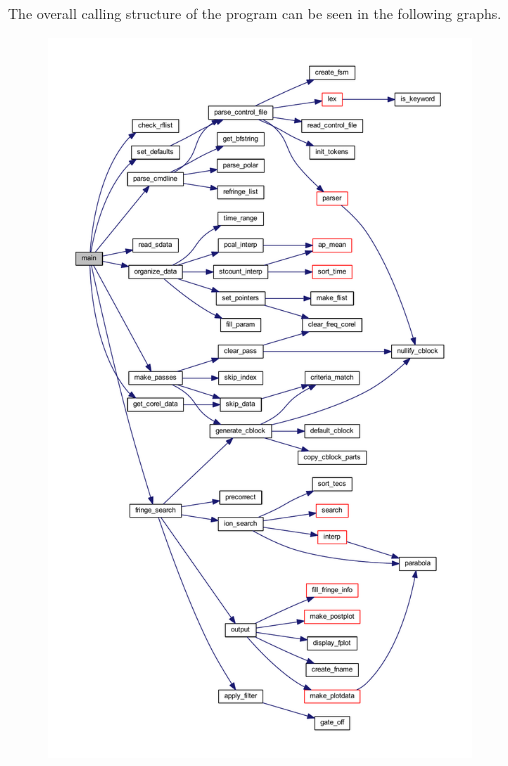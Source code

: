 The overall calling structure of the program can be seen in the following graphs.

\begin{figure}[tb]
  \centering
  \includegraphics[width=.9\linewidth]{./fourfit_graph.pdf}
  \label{fig:fourfitgraph}
\end{figure}


